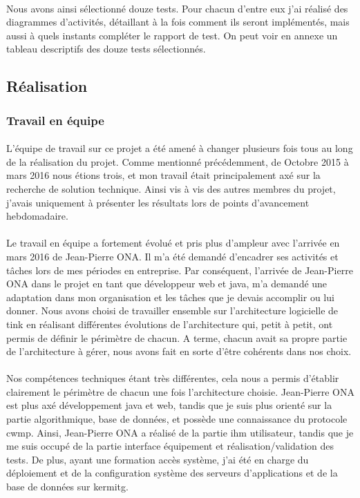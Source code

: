 \documentclass[12pt,a4paper]{report}
\begin{document}
\paragraph*{}Nous avons ainsi sélectionné douze tests. Pour chacun d'entre eux j'ai réalisé des diagrammes d'activités, détaillant à la fois comment ils seront implémentés, mais aussi à quels instants compléter le rapport de test. On peut voir en annexe un tableau descriptifs des douze tests sélectionnés. \\


\subsection{Réalisation}
\subsubsection{Travail en équipe}
\paragraph*{}L'équipe de travail sur ce projet a été amené à changer plusieurs fois tous au long de la réalisation du projet. Comme mentionné précédemment, de Octobre 2015 à mars 2016 nous étions trois, et mon travail était principalement axé sur la recherche de solution technique. Ainsi vis à vis des autres membres du projet, j'avais uniquement à présenter les résultats lors de points d'avancement hebdomadaire.
\paragraph*{}Le travail en équipe a fortement évolué et pris plus d'ampleur avec l'arrivée en mars 2016 de Jean-Pierre ONA. Il m’a été demandé d’encadrer ses activités et tâches lors de mes périodes en entreprise. Par conséquent, l’arrivée de Jean-Pierre ONA dans le projet en tant que développeur web et java, m’a demandé une adaptation dans mon organisation et les tâches que je devais accomplir ou lui donner. Nous avons choisi de travailler ensemble sur l’architecture logicielle de \gls{tink} en réalisant différentes évolutions de l’architecture qui, petit à petit, ont permis de définir le périmètre de chacun. A terme, chacun avait sa propre partie de l’architecture à
gérer, nous avons fait en sorte d’être cohérents dans nos choix.
\paragraph*{}Nos compétences techniques étant très différentes, cela nous a permis
d’établir clairement le périmètre de chacun une fois l’architecture choisie. Jean-Pierre ONA est plus axé développement java et web, tandis que je suis plus orienté sur la partie algorithmique, base de données, et possède une connaissance du protocole \gls{cwmp}. Ainsi, Jean-Pierre ONA a réalisé de la partie \gls{ihm} utilisateur, tandis que je me suis occupé de la partie interface équipement et réalisation/validation des tests. De plus, ayant une formation accès système, j’ai été en charge du déploiement et de la configuration système des serveurs d’applications et de la base de données sur \gls{kermitg}.
\end{document}
